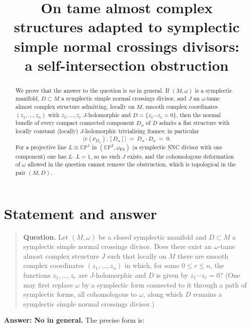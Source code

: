 \documentclass[11pt]{article}
\theoremstyle{definition}
\theoremstyle{remark}
\newcommand{\CP}{\mathbb{CP}}
\begin{document}
\title{On tame almost complex structures adapted to symplectic\\
simple normal crossings divisors:\\ a self-intersection obstruction}
\author{}
\date{}
\maketitle

\begin{abstract}
\noindent We prove that the answer to the question is \emph{no} in
general. If $(M,\omega)$ is a symplectic manifold, $D\subset M$ a
symplectic simple normal crossings divisor, and $J$ an $\omega$-tame
almost complex structure admitting, locally on $M$, smooth complex
coordinates $(z_1,\ldots,z_n)$ with $z_1,\ldots,z_r$
$J$-holomorphic and $D=\{z_1\cdots z_r=0\}$, then the normal bundle
of every compact connected component $D_\alpha$ of $D$ admits a flat
structure with locally constant (locally) $J$-holomorphic trivialising
frames; in particular
\[
\langle e(\nu_{D_\alpha}),[D_\alpha]\rangle\ =\
D_\alpha\cdot D_\alpha\ =\ 0 .
\]
For a projective line $L\cong\CP^1$ in $(\CP^2,\omega_{\mathrm{FS}})$
(a symplectic SNC divisor with one component) one has $L\cdot L=1$,
so no such $J$ exists, and the cohomologous deformation of $\omega$
allowed in the question cannot remove the obstruction, which is
topological in the pair $(M,D)$.
\end{abstract}

\section{Statement and answer}\label{sec:statement}

\begin{quote}
\textbf{Question.} Let $(M,\omega)$ be a closed symplectic manifold
and $D\subset M$ a symplectic simple normal crossings divisor. Does
there exist an $\omega$-tame almost complex structure $J$ such that
locally on $M$ there are smooth complex coordinates $(z_1,\ldots,z_n)$
in which, for some $0\le r\le n$, the functions $z_1,\ldots,z_r$ are
$J$-holomorphic and $D$ is given by $z_1\cdots z_r=0$? (One may first
replace $\omega$ by a symplectic form connected to it through a path
of symplectic forms, all cohomologous to $\omega$, along which $D$
remains a symplectic simple normal crossings divisor.)
\end{quote}

\medskip
\noindent\textbf{Answer: No in general.} The precise form is:
\end{document}
